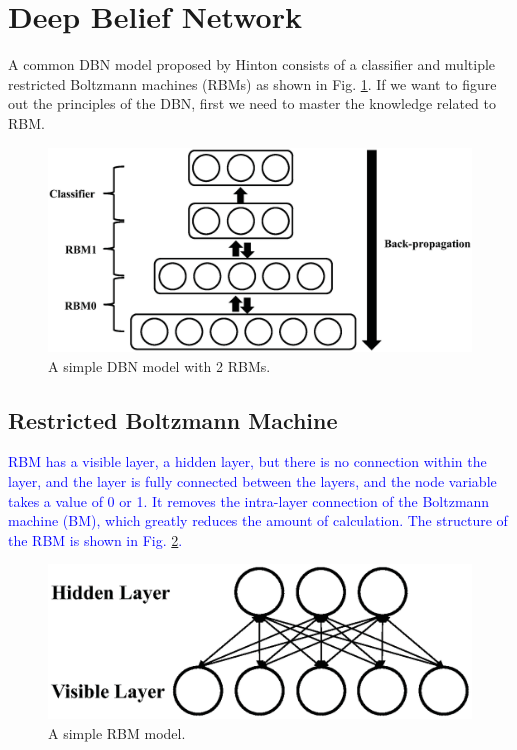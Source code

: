 \documentclass{modified}
\begin{document}
\section{Deep Belief Network}
A common DBN model \cite{hinton2006fast} proposed by Hinton consists of a classifier and multiple restricted Boltzmann machines (RBMs) as shown in Fig. \ref{fig:dbn}. If we want to figure out the principles of the DBN, first we need to master the knowledge related to RBM.

\begin{figure}[htbp]
	\centering
	\includegraphics[width=\columnwidth]{dbn.eps}
	\caption{A simple DBN model with 2 RBMs.}
	\label{fig:dbn}
\end{figure}

\subsection{Restricted Boltzmann Machine}
\textcolor{blue}{RBM \cite{hinton1986learning} has a visible layer, a hidden layer, but there is no connection within the layer, and the layer is fully connected between the layers, and the node variable takes a value of 0 or 1. It removes the intra-layer connection of the Boltzmann machine (BM), which greatly reduces the amount of calculation. The structure of the RBM is shown in Fig. \ref{fig:rbm}. }
		
\begin{figure}[htbp]
	\centering
	\includegraphics[width=\columnwidth]{rbm.eps}
	\caption{A simple RBM model.}
	\label{fig:rbm}
\end{figure}
	
\end{document}
